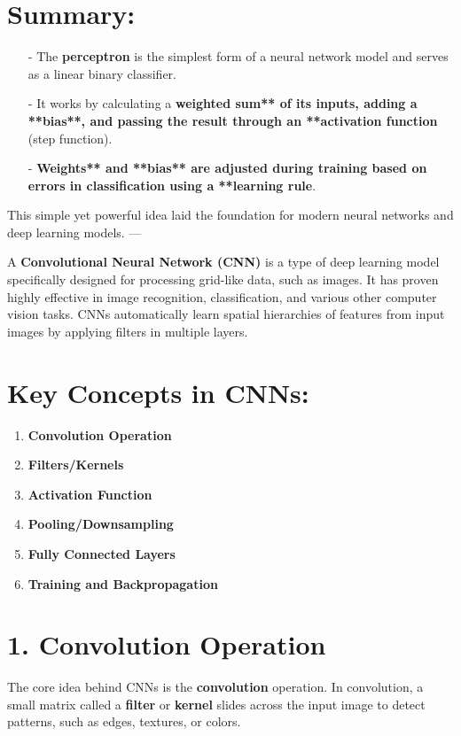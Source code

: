 \documentclass[10pt]{article}
\begin{document}
\section{ Summary:}
\begin{itemize}
   \item [-] The {\bf perceptron} is the simplest form of a neural network model and serves as a linear binary classifier.
   \item [-] It works by calculating a {\bf weighted sum** of its inputs, adding a **bias**, and passing the result through an **activation function} (step function).
   \item [-] {\bf Weights** and **bias** are adjusted during training based on errors in classification using a **learning rule}.
\end{itemize}

This simple yet powerful idea laid the foundation for modern neural networks and deep learning models.
---

A {\bf Convolutional Neural Network (CNN)} is a type of deep learning model specifically designed for processing grid-like data, such as images. It has proven highly effective in image recognition, classification, and various other computer vision tasks. CNNs automatically learn spatial hierarchies of features from input images by applying filters in multiple layers.

\section{ Key Concepts in CNNs:}

\begin{enumerate}
   \item {\bf Convolution Operation}
   \item {\bf Filters/Kernels}
   \item {\bf Activation Function}
   \item {\bf Pooling/Downsampling}
   \item {\bf Fully Connected Layers}
   \item {\bf Training and Backpropagation}
\end{enumerate}

\section{ 1. {\bf Convolution Operation}}
The core idea behind CNNs is the {\bf convolution} operation. 
In convolution, a small matrix called a {\bf filter} or {\bf kernel} slides across the input image to detect patterns, such as edges, textures, or colors.
\end{document}
